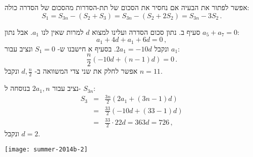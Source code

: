 אפשר לפתור את הבעיה אם נחסיר את הסכום של תת-הסדרות מהסכום של הסדרה כולה:
\[
S_1 = S_{3n} - (S_2+S_3) =  S_{3n} - (S_2 + 2S_2) = S_{3n} - 3S_2\,.
\]
\hspace*{1.5em}
\par
סעיף ב. נתון סכום הסדרה ועלינו למצוא
$d$
למרות שאין לנו 
$a_1$.
אבל נתון
$a_5+a_7=0$:
\[
a_1 + 4d + a_1 + 6d = 0\,,
\]
ונקבל
$2a_1=-10d$.
בסעיף א חישבנו ש-%
$S_1=0$
ונציב עבור 
$a_1$:
\[
\frac{n}{2}(-10d+(n-1)d)=0\,.
\]
אפשר לחלק את שני צדי המשוואה ב-%
$d,\frac{n}{2}$
ונקבל
$n=11$.

נציב עבור
$2a_1,n$
בנוסחה ל-%
$S_{3n}$:
\begin{eqnarray*}
S_3&=&\frac{3n}{2}(2a_1+(3n-1)d)\\
&=&\frac{33}{2}(-10d+(33-1)d)\\
&=&\frac{33}{2}\cdot 22d = 363d=726\,,
\end{eqnarray*}
ונקבל 
$d=2$.

\bigskip

\textbf{}

\begin{center}
\texttt{[image: summer-2014b-2]}
\end{center}
\vspace{-2ex}



